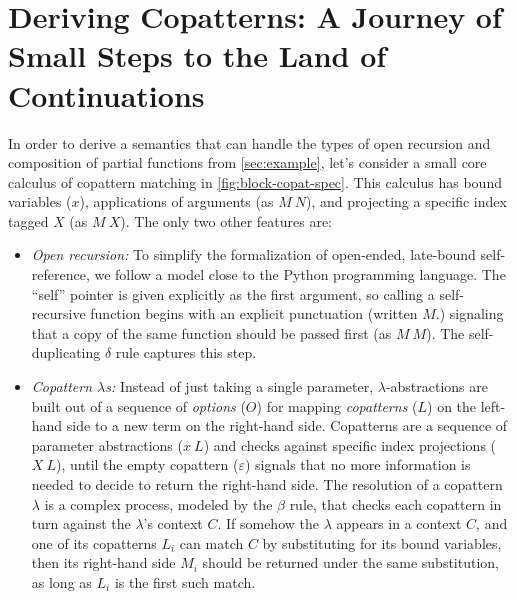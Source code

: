 \documentclass[sigplan,screen]{acmart}
\begin{document}
\section{Deriving Copatterns: A Journey of Small Steps to the Land of Continuations}
\label{sec:derive-copat}


In order to derive a semantics that can handle the types of open recursion and
composition of partial functions from \cref{sec:example}, let's consider a small
core calculus of copattern matching in \cref{fig:block-copat-spec}.  This
calculus has bound variables ($x$), applications of arguments (as $M~N$), and
projecting a specific index tagged $X$ (as $M~X$).  The only two other features
are:
\begin{itemize}
\item \emph{Open recursion:} To simplify the formalization of open-ended,
  late-bound self-reference, we follow a model close to the Python programming
  language.  The ``self'' pointer is given explicitly as the first argument, so
  calling a self-recursive function begins with an explicit punctuation (written
  $M.$) signaling that a copy of the same function should be passed first (as
  $M~M$).  The self-duplicating $\delta$ rule captures this step.
\item \emph{Copattern $\lambda$s:} Instead of just taking a single parameter,
  $\lambda$-abstractions are built out of a sequence of \emph{options} ($O$) for
  mapping \emph{copatterns} ($L$) on the left-hand side to a new term on the
  right-hand side.  Copatterns are a sequence of parameter abstractions ($x~L$)
  and checks against specific index projections ($X~L$), until the empty
  copattern ($\varepsilon$) signals that no more information is needed to decide
  to return the right-hand side.  The resolution of a copattern $\lambda$ is a
  complex process, modeled by the $\beta$ rule, that checks each copattern in
  turn against the $\lambda$'s context $C$.  If somehow the $\lambda$ appears in
  a context $C$, and one of its copatterns $L_i$ can match $C$ by substituting
  for its bound variables, then its right-hand side $M_i$ should be returned
  under the same substitution, as long as $L_i$ is the first such match.
\end{itemize}
\end{document}
